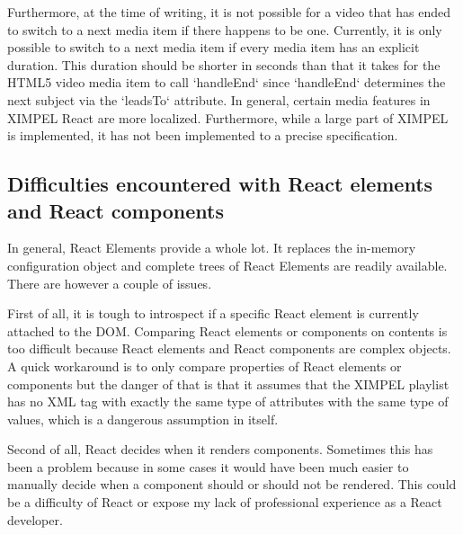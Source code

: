 Furthermore, at the time of writing, it is not possible for a video that has ended to switch to a next media item if there happens to be one. Currently, it is only possible to switch to a next media item if every media item has an explicit duration. This duration should be shorter in seconds than that it takes for the HTML5 video media item to call `handleEnd` since `handleEnd` determines the next subject via the `leadsTo` attribute. In general, certain media features in XIMPEL React are more localized. Furthermore, while a large part of XIMPEL is implemented, it has not been implemented to a precise specification.

\subsection{Difficulties encountered with React elements and React components}
In general, React Elements provide a whole lot. It replaces the in-memory configuration object and complete trees of React Elements are readily available. There are however a couple of issues.

First of all, it is tough to introspect if a specific React element is currently attached to the DOM. Comparing React elements or components on contents is too difficult because React elements and React components are complex objects. A quick workaround is to only compare properties of React elements or components but the danger of that is that it assumes that the XIMPEL playlist has no XML tag with exactly the same type of attributes with the same type of values, which is a dangerous assumption in itself.

Second of all, React decides when it renders components. Sometimes this has been a problem because in some cases it would have been much easier to manually decide when a component should or should not be rendered. This could be a difficulty of React or expose my lack of professional experience as a React developer.

